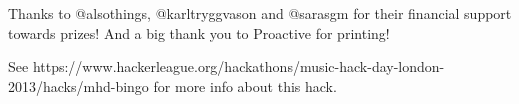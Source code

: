 \vspace{0.25cm}
\noindent
Thanks to @alsothings, @karltryggvason and @sara\textunderscore{}sgm for their financial support towards prizes! And a big thank you to Proactive for printing!
\vspace{0.25cm}

\noindent
See https://www.hackerleague.org/hackathons/music-hack-day-london-2013/hacks/mhd-bingo for more info about this hack.
\newpage